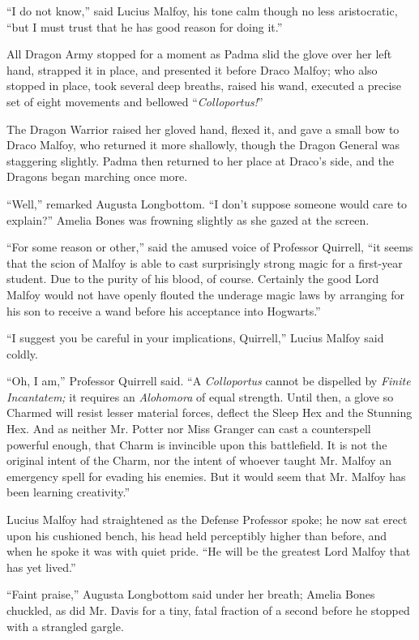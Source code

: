 ``I do not know,'' said Lucius Malfoy, his tone calm though no less aristocratic, ``but I must trust that he has good reason for doing it.''

All Dragon Army stopped for a moment as Padma slid the glove over her left hand, strapped it in place, and presented it before Draco Malfoy; who also stopped in place, took several deep breaths, raised his wand, executed a precise set of eight movements and bellowed ``\emph{Colloportus!}''

The Dragon Warrior raised her gloved hand, flexed it, and gave a small bow to Draco Malfoy, who returned it more shallowly, though the Dragon General was staggering slightly. Padma then returned to her place at Draco's side, and the Dragons began marching once more.

``Well,'' remarked Augusta Longbottom. ``I don't suppose someone would care to explain?'' Amelia Bones was frowning slightly as she gazed at the screen.

``For some reason or other,'' said the amused voice of Professor Quirrell, ``it seems that the scion of Malfoy is able to cast surprisingly strong magic for a first-year student. Due to the purity of his blood, of course. Certainly the good Lord Malfoy would not have openly flouted the underage magic laws by arranging for his son to receive a wand before his acceptance into Hogwarts.''

``I suggest you be careful in your implications, Quirrell,'' Lucius Malfoy said coldly.

``Oh, I am,'' Professor Quirrell said. ``A \emph{Colloportus} cannot be dispelled by \emph{Finite Incantatem;} it requires an \emph{Alohomora} of equal strength. Until then, a glove so Charmed will resist lesser material forces, deflect the Sleep Hex and the Stunning Hex. And as neither Mr. Potter nor Miss Granger can cast a counterspell powerful enough, that Charm is invincible upon this battlefield. It is not the original intent of the Charm, nor the intent of whoever taught Mr. Malfoy an emergency spell for evading his enemies. But it would seem that Mr. Malfoy has been learning creativity.''

Lucius Malfoy had straightened as the Defense Professor spoke; he now sat erect upon his cushioned bench, his head held perceptibly higher than before, and when he spoke it was with quiet pride. ``He will be the greatest Lord Malfoy that has yet lived.''

``Faint praise,'' Augusta Longbottom said under her breath; Amelia Bones chuckled, as did Mr. Davis for a tiny, fatal fraction of a second before he stopped with a strangled gargle.

